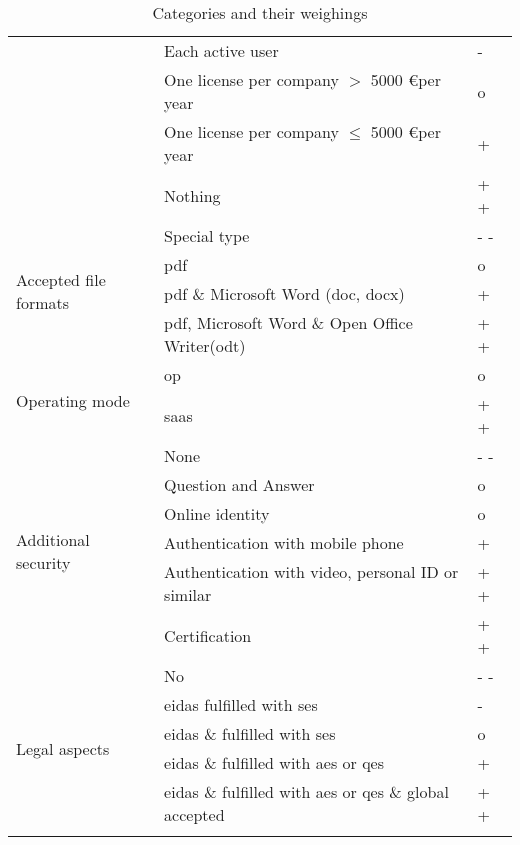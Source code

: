 \begin{longtable}{|p{4cm}|p{9cm}|p{1.5cm}|}
								& Each active user & - \\ \cline{2-3}
								& One license per company $>$ 5000 \euro per year & o \\ \cline{2-3}
								& One license per company $\leqslant$ 5000 \euro per year & + \\ \cline{2-3}
								& Nothing & + + \\ \hline
		\multirow{4}{*}{Accepted file formats} & Special type & - - \\ \cline{2-3}
												& \Gls{pdf} & o \\ \cline{2-3}
												& \Gls{pdf} \& Microsoft Word (doc, docx) & + \\ \cline{2-3}
												& \Gls{pdf}, Microsoft Word \& Open Office Writer(odt) & + + \\ \hline
		\multirow{2}{*}{Operating mode} & \gls{op} & o \\ \cline{2-3}
										 & \gls{saas} & + + \\ \hline
		\multirow{6}{*}{Additional security} & None & - - \\ \cline{2-3}
											& Question and Answer & o \\ \cline{2-3} 
											& Online identity & o \\ \cline{2-3}
											& Authentication with mobile phone & + \\ \cline{2-3}
											& Authentication with video, personal ID or similar & + + \\ \cline{2-3}
											& Certification & + + \\ \hline
		\multirow{6}{*}{Legal aspects} & No & - - \\ \cline{2-3}
										& \gls{eidas} fulfilled with \gls{ses} & - \\ \cline{2-3}
										& \gls{eidas} \& \glossary{gdpr} fulfilled with \gls{ses} & o \\ \cline{2-3}
										& \gls{eidas} \& \glossary{gdpr} fulfilled with \gls{aes} or \gls{qes} & + \\ \cline{2-3}
										& \gls{eidas} \& \glossary{gdpr} fulfilled with \gls{aes} or \gls{qes} \& global accepted & + + \\ \hline
	\caption{Categories and their weighings}
	\label{tab:resTcateg}
	\end{longtable}

